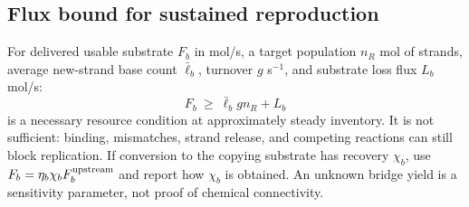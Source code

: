 \documentclass[11pt]{article}
\begin{document}
\subsection{Flux bound for sustained reproduction}
For delivered usable substrate $F_b$ in mol/s, a target population $n_R$ mol of
strands, average new-strand base count $\bar\ell_b$, turnover $g$ s$^{-1}$,
and substrate loss flux $L_b$ mol/s:
\begin{equation}
F_b\ \ge\ \bar\ell_b g n_R+L_b
\end{equation}
is a necessary resource condition at approximately steady inventory. It is not
sufficient: binding, mismatches, strand release, and competing reactions can
still block replication. If conversion to the copying substrate has recovery
$\chi_b$, use $F_b=\eta_b\chi_bF_b^{\rm upstream}$ and report how $\chi_b$ is
obtained. An unknown bridge yield is a sensitivity parameter, not proof of
chemical connectivity.
\end{document}
